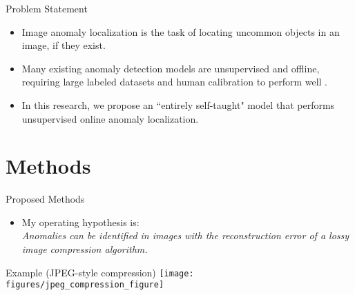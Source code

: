\documentclass[10pt,handout]{beamer}
\newcommand{\tabimg}[2]{\begin{tabular}{c}\texttt{[image: \#1]}\end{tabular}}
\begin{document}

\begin{frame}{Problem Statement}
\begin{itemize}
\item \alert{Image anomaly localization} is the task of locating uncommon objects in an image, if they exist.

\item Many existing anomaly detection models are unsupervised and offline, requiring large labeled datasets and human calibration to perform well \cite{wta_detection, attention_anomalies}.

\item In this research, we propose an ``entirely self-taught" model that performs \alert{unsupervised online anomaly localization}.\\[4mm]



\end{itemize}
\end{frame}

\section{Methods}

\begin{frame}{Proposed Methods}
\begin{itemize}

\item My operating hypothesis is:\\ 
\alert{\textit{Anomalies can be identified in images with the reconstruction error of a lossy image compression algorithm.}}\\[0.5cm]
\end{itemize}


\begin{exampleblock}{Example (JPEG-style compression)}
\texttt{[image: figures/jpeg\_compression\_figure]}

\end{exampleblock}


\end{frame}
\end{document}
